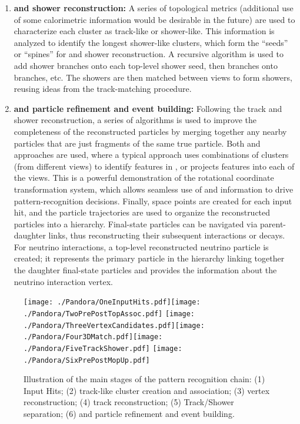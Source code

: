 \begin{enumerate}
\item{\bf \twod and \threed shower reconstruction:} A series of topological metrics (additional use of some calorimetric information would be desirable in the future) are used to characterize each \twod cluster as track-like or shower-like. This information is analyzed to identify the longest shower-like clusters, which form the ``seeds'' or ``spines'' for \twod and \threed shower reconstruction. A recursive algorithm is used to add shower branches onto each top-level shower seed, then branches onto branches, etc. The \twod showers are then matched between views to form \threed showers, reusing ideas from the \threed track-matching procedure.
\item{\bf \twod and \threed particle refinement and event building:} Following the \threed track and shower reconstruction, a series of algorithms is used to improve the completeness of the reconstructed particles by merging together any nearby particles that are just fragments of the same true particle. Both \twod and \threed approaches are used, %
where a typical approach uses combinations of \twod clusters (from different views) to identify features in \threed, or projects \threed features into each of the \twod views. This is a powerful demonstration of the  rotational coordinate transformation system, which allows seamless use of \twod and \threed information to drive pattern-recognition decisions. Finally, \threed space points are created for each \twod input hit, and the \threed particle trajectories are used to organize the reconstructed particles into a hierarchy. Final-state particles can be navigated via parent-daughter links, thus reconstructing their subsequent interactions or decays. For neutrino interactions, a top-level reconstructed neutrino particle is created; it represents the primary particle in the hierarchy linking together the daughter final-state particles and provides the information about the neutrino interaction vertex.

\end{enumerate}

\begin{figure}[!h!tbp]
\centering
\texttt{[image: ./Pandora/OneInputHits.pdf]}\texttt{[image: ./Pandora/TwoPrePostTopAssoc.pdf]}
\texttt{[image: ./Pandora/ThreeVertexCandidates.pdf]}\texttt{[image: ./Pandora/Four3DMatch.pdf]}\texttt{[image: ./Pandora/FiveTrackShower.pdf]}
\texttt{[image: ./Pandora/SixPrePostMopUp.pdf]}
\caption{Illustration of the main stages of the  pattern recognition chain: (1) Input Hits; (2) \twod track-like cluster creation and association; (3) \threed vertex reconstruction; (4) \threed track reconstruction; (5) Track/Shower separation; (6) \twod and \threed particle refinement and event building.}
\label{reco_steps}
\end{figure}

